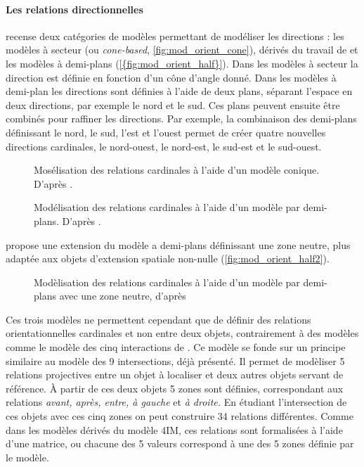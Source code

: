 \paragraph{Les relations directionnelles}

\textcite{Frank1992} recense deux catégories de modèles permettant de
modéliser les directions : les modèles à secteur (ou
\emph{cone-based}, \autoref{fig:mod_orient_cone}), dérivés du travail
de \textcite{Peuquet1987} et les modèles à demi-plans
(\autoref{{fig:mod_orient_half}}). Dans les modèles à secteur la
direction est définie en fonction d'un cône d'angle donné. Dans les
modèles à demi-plan les directions sont définies à l'aide de deux
plans, séparant l'espace en deux directions, par exemple le nord et le
sud. Ces plans peuvent ensuite être combinés pour raffiner les
directions. Par exemple, la combinaison des demi-plans définissant le
nord, le sud, l'est et l'ouest permet de créer quatre nouvelles
directions cardinales, le nord-ouest, le nord-est, le sud-est et le
sud-ouest.

\begin{figure}
  \centering
    
    \caption{Mosélisation des relations cardinales à l'aide d'un
      modèle conique. D'après \textcite{Renz2004}.}
  \label{fig:mod_orient_cone}
\end{figure}

\begin{figure}
  \centering
    
  \caption{Modélisation des relations cardinales à l'aide d'un modèle
    par demi-plans. D'après \textcite{Frank1992}.}
  \label{fig:mod_orient_half}
\end{figure}


\textcite{Frank1992} propose une extension du modèle a demi-plans
définissant une zone neutre, plus adaptée aux objets d'extension
spatiale non-nulle (\autoref{fig:mod_orient_half2}).

\begin{figure}
  \centering
    
  \caption{Modèlisation des relations cardinales à l'aide d'un modèle
    par demi-plans avec une zone neutre, d'après \textcite{Frank1992}}
  \label{fig:mod_orient_half2}
\end{figure}

Ces trois modèles ne permettent cependant que de définir des relations
orientationnelles cardinales et non entre deux objets, contrairement à
des modèles comme le modèle des cinq interactions de
\textcite{Clementini2006}. Ce modèle se fonde sur un principe
similaire au modèle des 9 intersections, déjà présenté. Il permet de
modèliser 5 relations projectives entre un objet à localiser et deux
autres objets servant de référence. À partir de ces deux objets 5
zones sont définies, correspondant aux relations \emph{avant, après,
  entre, à gauche} et \emph{à droite.} En étudiant l'intersection de
ces objets avec ces cinq zones on peut construire 34 relations
différentes. Comme dans les modèles dérivés du modèle 4IM, ces
relations sont formalisées à l'aide d'une matrice, ou chacune des 5
valeurs correspond à une des 5 zones définie par le modèle.

